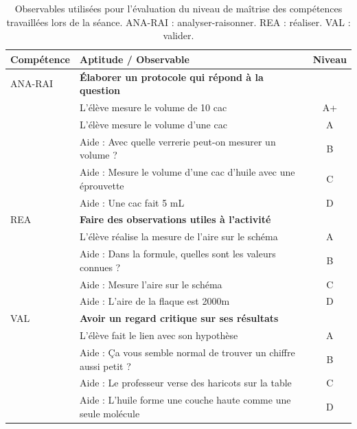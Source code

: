 \documentclass[12pt,a4paper]{article}
\newcommand{\rea}{\colorbox{yellow_c}{\textcolor{yellow_f}{REA}}}
\newcommand{\anarai}{\colorbox{green_c}{\textcolor{green_f}{ANA-RAI}}}
\newcommand{\val}{\colorbox{orange_c}{\textcolor{orange_f}{VAL}}}
\begin{document}
\begin{table}[p]
\center
\begin{tabular}{l|l|c}
\textbf{Compétence} & \textbf{Aptitude} / Observable & \textbf{Niveau} \\
\hline \hline
\anarai 	& \textbf{Élaborer un protocole qui répond à la question} 	& \\
				& L'élève mesure le volume de 10 cac				 						& A+ \\
				& L'élève mesure le volume d'une cac 									& A \\
				& Aide : Avec quelle verrerie peut-on mesurer un volume ?	& B \\
				& Aide : Mesure le volume d'une cac d'huile avec une éprouvette & C \\
				& Aide : Une cac fait 5 mL 															& D \\
\hline
\rea			& \textbf{Faire des observations utiles à l'activité}					& \\
				& L'élève réalise la mesure de l'aire sur le schéma				& A \\
				& Aide : Dans la formule, quelles sont les valeurs connues ? & B \\
				& Aide : Mesure l'aire sur le schéma											& C \\
				& Aide : L'aire de la flaque est \unit{2000}{m\squared}			& D \\
\hline
\val			& \textbf{Avoir un regard critique sur ses résultats}				& \\
				& L'élève fait le lien avec son hypothèse									& A \\
				& Aide : Ça vous semble normal de trouver un chiffre aussi petit ? & B \\
				& Aide : Le professeur verse des haricots sur la table			& C \\
				& Aide : L'huile forme une couche haute comme une seule molécule & D \\
\end{tabular}
\caption{Observables utilisées pour l'évaluation du niveau de maîtrise des compétences travaillées lors de la séance.
\anarai{} : analyser-raisonner.
\rea{} : réaliser.
\val{} : valider.}
\label{tab:cptces_tp}
\end{table}
\end{document}
